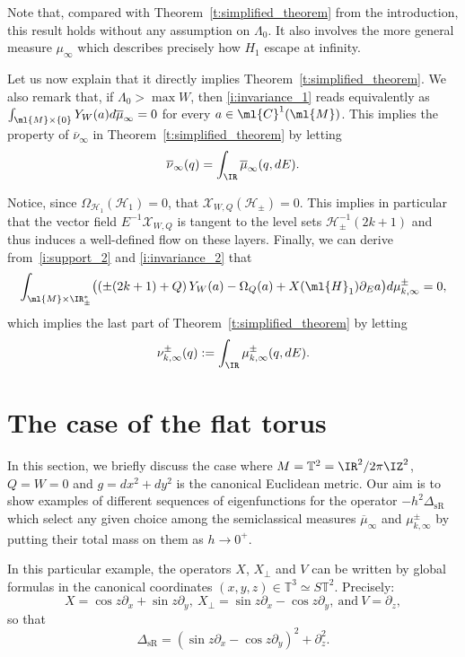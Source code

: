 \documentclass[10pt]{amsart}
\theoremstyle{plain}
\theoremstyle{definition}
\theoremstyle{remark}
\begin{document}
Note that, compared with Theorem~\ref{t:simplified_theorem} from the introduction, this result holds without any assumption on $\Lambda_0$. It also involves the more general measure $\mu_\infty$ which describes precisely how $H_1$ escape at infinity.

Let us now explain that it directly implies Theorem~\ref{t:simplified_theorem}. We also remark that, if $\Lambda_0>\max W$, then \eqref{i:invariance_1} reads equivalently as
$\int_{\ml{M}\times\{0\}} Y_W(a) d\overline{ \mu}_\infty = 0$ for every $a\in\ml{C}^1(\ml{M})$. This implies the property of $\overline{\nu}_\infty$ in Theorem~\ref{t:simplified_theorem} by letting
\[
\overline{\nu}_\infty(q) = \int_\IR \overline{\mu}_\infty(q,dE).
\]

Notice, since $\Omega_{\mathcal{H}_1}(\mathcal{H}_1) = 0$, that $\mathcal{X}_{W,Q}(\mathcal{H}_\pm) = 0$. This implies in particular that the vector field $E^{-1}\mathcal{X}_{W,Q}$ is tangent to the level sets $\mathcal{H}_\pm^{-1}(2k+1)$ and thus induces a well-defined flow on these layers. Finally, we can derive from~\eqref{i:support_2} and \eqref{i:invariance_2} that
\[
\int_{\ml{M}\times\IR^*_{\pm}}\bigl(\left(\pm(2k+1)+Q\right)Y_W(a)-\Omega_Q(a)+X(\ml{H}_1)\partial_Ea \bigr) d\mu^\pm_{k,\infty} = 0,
\]
which implies the last part of Theorem~\ref{t:simplified_theorem} by letting
\[
\nu_{k,\infty}^\pm(q) := \int_\IR \mu_{k,\infty}^\pm(q,dE).
\]

\section{The case of the flat torus}\label{s:torus}

In this section, we briefly discuss the case where $M= \mathbb{T}^2 = \IR^2/2\pi\IZ^2$, $Q=W=0$ and $g=dx^2+dy^2$ is the canonical Euclidean metric. Our aim is to show examples of different sequences of eigenfunctions for the operator $-h^2 \Delta_{\operatorname{sR}}$ which select any given choice among the semiclassical measures $\overline{\mu}_\infty$ and $\mu_{k,\infty}^{\pm}$ by putting their total mass on them as $h \to 0^+$.

In this particular example, the operators $X$, $X_\perp$ and $V$ can be written by global formulas in the canonical coordinates $(x,y,z) \in \mathbb{T}^3 \simeq S\mathbb{T}^2$. Precisely:
\[
X=\cos z\partial_x+\sin z \partial_y,\ X_\perp=\sin z\partial_x-\cos z\partial_y,\ \text{and}\ V=\partial_z,
\]
so that
\[
\Delta_{\text{sR}}=\left(\sin z\partial_x-\cos z\partial_y\right)^2+\partial_z^2.
\]
\end{document}
